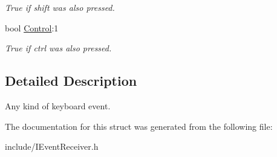 \begin{DoxyCompactItemize}
\begin{DoxyCompactList}\small\item\em True if shift was also pressed. \end{DoxyCompactList}\item 
bool \hyperlink{structirr_1_1SEvent_1_1SKeyInput_a4f8138bfd7842939bde07e7d63bc7434}{Control}\+:1\hypertarget{structirr_1_1SEvent_1_1SKeyInput_a4f8138bfd7842939bde07e7d63bc7434}{}\label{structirr_1_1SEvent_1_1SKeyInput_a4f8138bfd7842939bde07e7d63bc7434}

\begin{DoxyCompactList}\small\item\em True if ctrl was also pressed. \end{DoxyCompactList}\end{DoxyCompactItemize}


\subsection{Detailed Description}
Any kind of keyboard event. 

The documentation for this struct was generated from the following file\+:\begin{DoxyCompactItemize}
\item 
include/I\+Event\+Receiver.\+h\end{DoxyCompactItemize}
